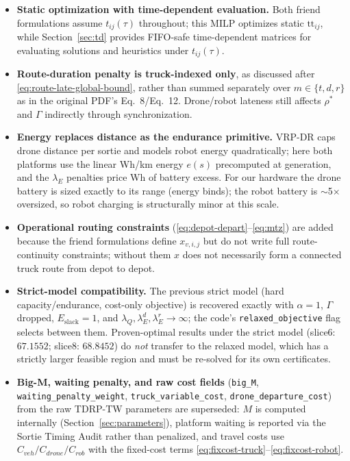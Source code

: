 \documentclass[10pt]{article}
\begin{document}
\begin{itemize}
\item \textbf{Static optimization with time-dependent evaluation.} Both friend
formulations assume $t_{ij}(\tau)$ throughout; this MILP optimizes static
$\mathrm{tt}_{ij}$, while Section~\ref{sec:td} provides FIFO-safe
time-dependent matrices for evaluating solutions and heuristics under
$t_{ij}(\tau)$.
\item \textbf{Route-duration penalty is truck-indexed only}, as discussed after
\eqref{eq:route-late-global-bound}, rather than summed separately over
$m\in\{t,d,r\}$ as in the original PDF's Eq.~8/Eq.~12. Drone/robot lateness
still affects $\rho^*$ and $\Gamma$ indirectly through synchronization.
\item \textbf{Energy replaces distance as the endurance primitive.}
VRP-DR caps drone distance per sortie and models robot energy quadratically;
here both platforms use the linear Wh/km energy $e(s)$ precomputed at
generation, and the $\lambda_E$ penalties price Wh of battery excess. For our
hardware the drone battery is sized exactly to its range (energy binds); the
robot battery is $\sim$5$\times$ oversized, so robot charging is structurally
minor at this scale.
\item \textbf{Operational routing constraints}
(\eqref{eq:depot-depart}--\eqref{eq:mtz}) are added because the friend
formulations define $x_{v,i,j}$ but do not write full route-continuity
constraints; without them $x$ does not necessarily form a connected truck
route from depot to depot.
\item \textbf{Strict-model compatibility.} The previous strict model (hard
capacity/endurance, cost-only objective) is recovered exactly with $\alpha=1$,
$\Gamma$ dropped, $E_{\mathrm{slack}}=1$, and
$\lambda_Q,\lambda^d_E,\lambda^r_E\to\infty$; the code's
\texttt{relaxed\_objective} flag selects between them. Proven-optimal results
under the strict model (slice6: $67.1552$; slice8: $68.8452$) do \emph{not}
transfer to the relaxed model, which has a strictly larger feasible region and
must be re-solved for its own certificates.
\item \textbf{Big-M, waiting penalty, and raw cost fields}
(\texttt{big\_M}, \texttt{waiting\_penalty\_weight}, \texttt{truck\_variable\_cost},
\texttt{drone\_departure\_cost}) from the raw TDRP-TW parameters are superseded:
$M$ is computed internally (Section~\ref{sec:parameters}), platform waiting is
reported via the Sortie Timing Audit rather than penalized, and travel costs use
$C_{veh}/C_{drone}/C_{rob}$ with the fixed-cost terms \eqref{eq:fixcost-truck}--\eqref{eq:fixcost-robot}.
\end{itemize}
\end{document}
